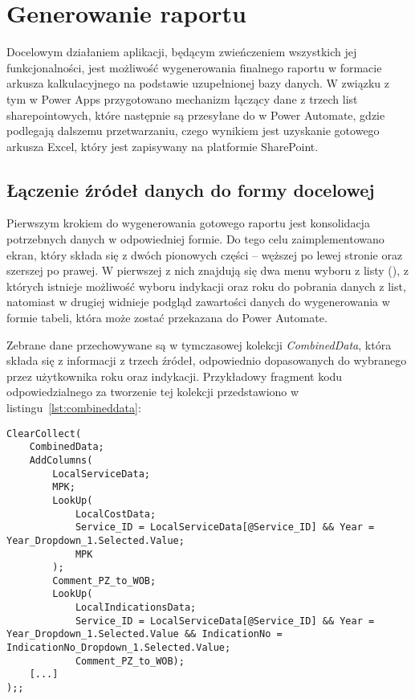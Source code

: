 \section{Generowanie raportu}

Docelowym działaniem aplikacji, będącym zwieńczeniem wszystkich jej funkcjonalności, jest możliwość wygenerowania finalnego raportu w formacie arkusza kalkulacyjnego na podstawie uzupełnionej bazy danych. W związku z tym w Power Apps przygotowano mechanizm łączący dane z trzech list sharepointowych, które następnie są przesyłane do w Power Automate, gdzie podlegają dalszemu przetwarzaniu, czego wynikiem jest uzyskanie gotowego arkusza Excel, który jest zapisywany na platformie SharePoint.

\subsection{Łączenie źródeł danych do formy docelowej}

Pierwszym krokiem do wygenerowania gotowego raportu jest konsolidacja potrzebnych danych w odpowiedniej formie. Do tego celu zaimplementowano ekran, który składa się z dwóch pionowych części -- węższej po lewej stronie oraz szerszej po prawej. W pierwszej z nich znajdują się dwa menu wyboru z listy (), z których istnieje możliwość wyboru indykacji oraz roku do pobrania danych z list, natomiast w drugiej widnieje podgląd zawartości danych do wygenerowania w formie tabeli, która może zostać przekazana do Power Automate.

Zebrane dane przechowywane są w tymczasowej kolekcji \textit{CombinedData}, która składa się z informacji z trzech źródeł, odpowiednio dopasowanych do wybranego przez użytkownika roku oraz indykacji. Przykładowy fragment kodu odpowiedzialnego za tworzenie tej kolekcji przedstawiono w listingu~\ref{lst:combineddata}:

\begin{lstlisting}[language=PowerFx, caption={Fragment kodu tworzącego kolekcję CombinedData}, label={lst:combineddata}] 
    ClearCollect(
    CombinedData;
    AddColumns(
        LocalServiceData;
        MPK;
        LookUp(
            LocalCostData;
            Service_ID = LocalServiceData[@Service_ID] && Year = Year_Dropdown_1.Selected.Value;
            MPK
        );
        Comment_PZ_to_WOB;
        LookUp(
            LocalIndicationsData;
            Service_ID = LocalServiceData[@Service_ID] && Year = Year_Dropdown_1.Selected.Value && IndicationNo = IndicationNo_Dropdown_1.Selected.Value;
            Comment_PZ_to_WOB);     
    [...]
);;

\end{lstlisting}

